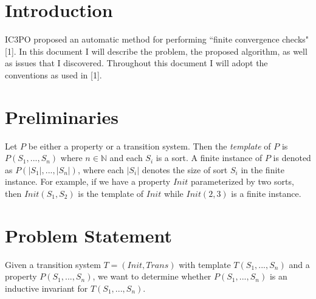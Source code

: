 \documentclass[12pt]{article}
\begin{document}
\maketitle

\section{Introduction}
IC3PO proposed an automatic method for performing ``finite convergence checks" [1].  In this document I will describe the problem, the proposed algorithm, as well as issues that I discovered.  Throughout this document I will adopt the conventions as used in [1].

\section{Preliminaries}
Let $P$ be either a property or a transition system.  Then the \textit{template} of $P$ is $P(S_1,...,S_n)$ where $n \in \mathbb{N}$ and each $S_i$ is a sort.  A finite instance of $P$ is denoted as $P(|S_1|,...,|S_n|)$, where each $|S_i|$ denotes the size of sort $S_i$ in the finite instance.  For example, if we have a property $Init$ parameterized by two sorts, then $Init(S_1,S_2)$ is the template of $Init$ while $Init(2,3)$ is a finite instance.

\section{Problem Statement}
\label{problem-statement}
Given a transition system $T = (Init,Trans)$ with template $T(S_1,...,S_n)$ and a property $P(S_1,...,S_n)$, we want to determine whether $P(S_1,...,S_n)$ is an inductive invariant for $T(S_1,...,S_n)$.
\end{document}
